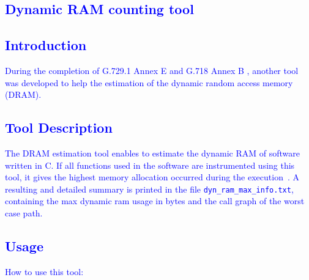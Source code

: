 \textcolor{blue}{
\section{Dynamic RAM counting tool}
%
\subsection{Introduction}
During the completion of G.729.1 Annex E \cite{G.729.1E} and
G.718 Annex B \cite{G.718B}, another tool was developed to help
the estimation of the dynamic random access memory (DRAM).
\subsection{Tool Description}
The DRAM estimation tool enables to estimate the dynamic RAM of
software written in C. If all functions used in the software are
instrumented using this tool, it gives the highest memory allocation
occurred during the execution~\cite{AC-1004-Q10-15}. A resulting and
detailed summary is printed in the file {\tt dyn\_ram\_max\_info.txt},
containing the max dynamic ram usage in bytes and the call graph of
the worst case path.}
%
\textcolor{blue}{
\subsection{Usage}
How to use this tool:
}
